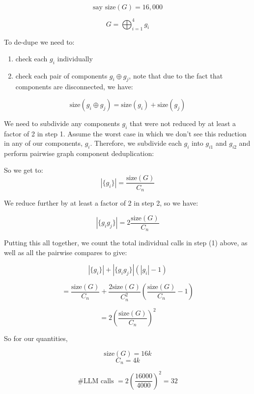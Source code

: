 \documentclass[11pt, oneside]{article}
\begin{document}
\[ \text{say } \text{size}(G) = 16,000 \]

\[ G = \bigoplus_{i=1}^{4} g_i \]

To de-dupe we need to:
\begin{enumerate}
    \item check each \( g_i \) individually
    \item check each pair of components \( g_i \oplus g_j \), note that due to the fact that components are disconnected, we have:
\end{enumerate}

\[ \text{size}(g_i \oplus g_j) = \text{size}(g_i) + \text{size}(g_j) \]

We need to subdivide any components \(g_i\) that were not reduced by at least a factor of 2 in step 1. Assume the worst case in which we don't see this reduction in any of our components, \(g_i\). Therefore, we subdivide each \(g_i\) into \(g_{i1}\) and \(g_{i2}\) and perform pairwise graph component deduplication:

So we get to:
\[ |\{g_i \}| = \frac{\text{size}(G)}{C_n} \]

We reduce further by at least a factor of 2 in step 2, so we have:

\[ |\{g_i g_j \}| = 2 \frac{\text{size}(G)}{C_n} \]

Putting this all together, we count the total individual calls in step (1) above, as well as all the pairwise compares to give:

\[ |\{g_i \}| + |\{g_i g_j \}| (|g_i| - 1) \]

\[ = \frac{\text{size}(G)}{C_n} + \frac{2 \text{size}(G)}{C_n^2} \left(\frac{\text{size}(G)}{C_n} - 1\right) \]

\[ = 2 \left( \frac{\text{size}(G)}{C_n} \right)^2 \]

So for our quantities,

\[ \text{size}(G) = 16k \]
\[ C_n = 4k \]

\[ \text{\# LLM  calls } = 2 \left( \frac{16000}{4000} \right)^2 = 32 \]
\end{document}

